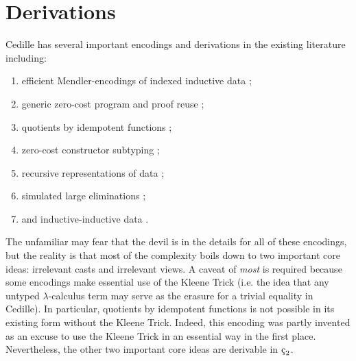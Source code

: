 \section{Derivations}

Cedille has several important encodings and derivations in the existing literature including:
\begin{enumerate}
    \item efficient Mendler-encodings of indexed inductive data \cite{firsov2018_mendler};
    \item generic zero-cost program and proof reuse \cite{diehl2018_generic_reuse};
    \item quotients by idempotent functions \cite{marmaduke2020quotients};
    \item zero-cost constructor subtyping \cite{marmaduke2020_constructor_subtyping};
    \item recursive representations of data \cite{jenkins2021monotone};
    \item simulated large eliminations \cite{jenkins2021_large_elim};
    \item and inductive-inductive data \cite{marmaduke2023_indind}.
\end{enumerate}
The unfamiliar may fear that the devil is in the details for all of these encodings, but the reality is that most of the complexity boils down to two important core ideas: irrelevant casts and irrelevant views.
A caveat of \textit{most} is required because some encodings make essential use of the Kleene Trick (i.e. the idea that any untyped $\lambda$-calculus term may serve as the erasure for a trivial equality in Cedille).
In particular, quotients by idempotent functions is not possible in its existing form without the Kleene Trick.
Indeed, this encoding was partly invented as an excuse to use the Kleene Trick in an essential way in the first place.
Nevertheless, the other two important core ideas are derivable in $\ced$.

